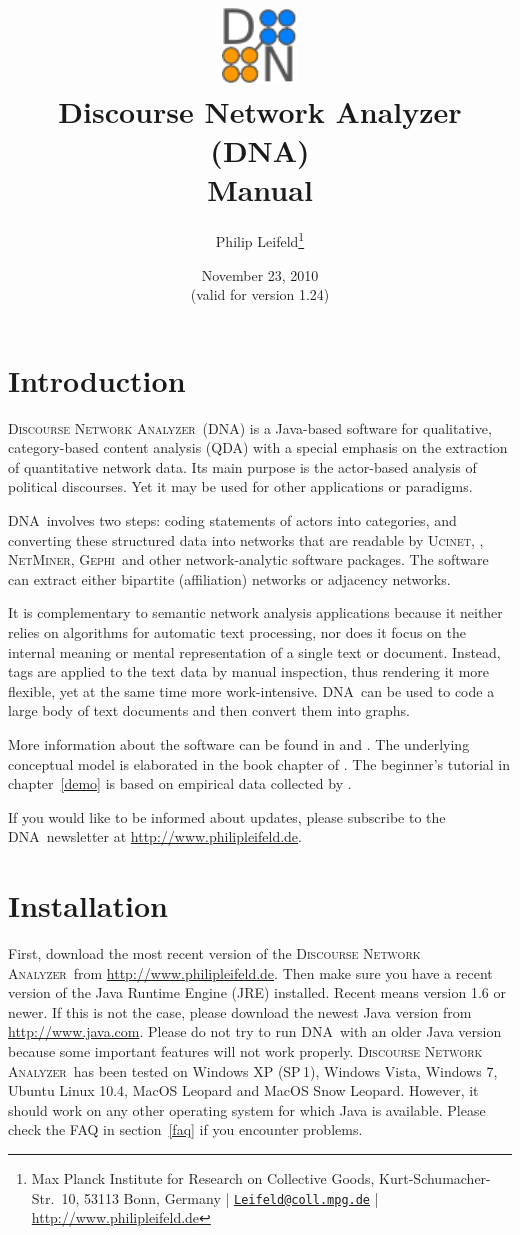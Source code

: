 \documentclass[12pt,a4paper]{scrreprt}
\author{Philip Leifeld\footnote{Max Planck Institute for Research on Collective Goods, Kurt-Schumacher-Str.~10, 53113 Bonn, Germany | \href{mailto:Leifeld@coll.mpg.de}{\texttt{Leifeld@coll.mpg.de}} | \url{http://www.philipleifeld.de}}}
\title{\includegraphics[width=2cm]{dna32.pdf}\\ \vspace{0.5cm} Discourse Network Analyzer (DNA)\\ \vspace{0.3cm} \textbf{Manual}}
\date{November 23, 2010\\ \vspace{0.3cm} (valid for version 1.24)}
\newcommand{\visone}
{\textsf%
 {\protect\raisebox{.5ex}{\color[rgb]{0.1,0.1,0.1}v}%
  \protect\raisebox{.1ex}{\color[rgb]{0.3,0.3,0.3}i}%
  \protect\raisebox{-.1ex}{\color[rgb]{0.1,0.1,0.1}s}%
  \protect\raisebox{.1ex}{\color[rgb]{0.3,0.3,0.3}o}%
  \protect\raisebox{-.1ex}{\color[rgb]{0.1,0.1,0.1}n}%
  \protect\raisebox{-.4ex}{\color[rgb]{0.3,0.3,0.3}e}%
 }%
}
\newcommand{\ucinet}{\textsc{Ucinet}}
\newcommand{\dnalong}{\textsc{Discourse} \textsc{Network} \textsc{Analyzer}}
\newcommand{\dnashort}{\textsc{DNA}}
\newcommand{\netminer}{\textsc{NetMiner}}
\newcommand{\gephi}{\textsc{Gephi}}
\begin{document}
\maketitle
\setcounter{tocdepth}{2}
\tableofcontents

\chapter{Introduction}
\dnalong\ (\dnashort) is a Java-based software for qualitative, category-based content analysis (QDA) with a special emphasis on the extraction of quantitative network data. Its main purpose is the actor-based analysis of political discourses. Yet it may be used for other applications or paradigms.

\dnashort\ involves two steps: coding statements of actors into categories, and converting these structured data into networks that are readable by \ucinet, \visone, \netminer, \gephi\ and other network-analytic software packages. The software can extract either bipartite (affiliation) networks or adjacency networks.

It is complementary to semantic network analysis applications because it neither relies on algorithms for automatic text processing, nor does it focus on the internal meaning or mental representation of a single text or document. Instead, tags are applied to the text data by manual inspection, thus rendering it more flexible, yet at the same time more work-intensive. \dnashort\ can be used to code a large body of text documents and then convert them into graphs.

More information about the software can be found in \citet{leifeld2009die,leifeld2010political} and \citet{leifeld2010comparison}. The underlying conceptual model is elaborated in the book chapter of \citet{janning2009diskursnetzwerkanalyse.}. The beginner's tutorial in chapter~\ref{demo} is based on empirical data collected by \citet{fisher2009understanding}.

If you would like to be informed about updates, please subscribe to the \dnashort\ newsletter at \url{http://www.philipleifeld.de}.


\chapter{Installation}\label{installation}
First, download the most recent version of the \dnalong\ from \url{http://www.philipleifeld.de}. Then make sure you have a recent version of the Java Runtime Engine (JRE) installed. Recent means version 1.6 or newer. If this is not the case, please download the newest Java version from \url{http://www.java.com}. Please do not try to run \dnashort\ with an older Java version because some important features will not work properly. \dnalong\ has been tested on Windows XP (SP\,1), Windows Vista, Windows 7, Ubuntu Linux 10.4, MacOS Leopard and MacOS Snow Leopard. However, it should work on any other operating system for which Java is available. Please check the FAQ in section~\ref{faq} if you encounter problems.
\end{document}
